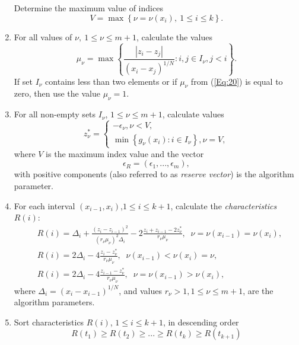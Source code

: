 \documentclass[
11pt,%
tightenlines,%
twoside,%
onecolumn,%
nofloats,%
nobibnotes,%
nofootinbib,%
superscriptaddress,%
noshowpacs,%
centertags]%
{revtex4}
\begin{document}
\begin{enumerate}
Determine the maximum value of indices
\begin{equation}\label{Eq:19}
V=\max \left\{\nu = \nu(x_i), \ 1\leq i \leq k\right\}.
\end{equation}
\item
For all values of $\nu, \ 1\leq \nu \leq m+1$, calculate the values  
\begin{equation}\label{Eq:20}
\mu_\nu = \max \left\{ \frac{\left|z_i-z_j\right|}{\left(x_i-x_j\right)^{1/N}} : i,j \in I_\nu, j<i\right\}.
\end{equation}
If set $I_\nu$ contains less than two elements or if $\mu_\nu$ from (\ref{Eq:20}) is equal to zero, then use the value $\mu_\nu=1$.
\item
For all non-empty sets $I_\nu$, $1 \leq \nu \leq m+1$, calculate values
\begin{equation}\label{Eq:21}
  z^\ast_\nu =  
   \begin{cases}
    -\epsilon_\nu,  \nu < V, \\
    \min{\left\{g_\nu(x_i):i\in I_\nu\right\}}, \nu = V,
   \end{cases}
\end{equation}
where $V$ is the maximum index value and the vector
\begin{equation}\label{Eq:22}
\epsilon _R=\left(\epsilon_1,...,\epsilon_m\right),
\end{equation}
with positive components (also referred to as \textit{reserve vector}) is the algorithm parameter.
\item
For each interval $(x_{i-1},x_i)$,$1 \leq i \leq k+1$, calculate the \textit{characteristics} $R(i)$: 
\begin{eqnarray}\label{R}
&R(i)=\Delta_i+ \frac{(z_i-z_{i-1})^2}{(r_\nu\mu_\nu)^2\Delta_i}-2\frac{z_i+z_{i-1}-2z^\ast_\nu}{r_\nu\mu_\nu},\;\; \nu=\nu(x_{i-1})=\nu(x_i),\nonumber \\
&R(i)= 2\Delta_i-4\frac{z_i-z^\ast_\nu}{r_\nu\mu_\nu},\;\; \nu(x_{i-1})<\nu(x_i)=\nu,\\
&R(i)= 2\Delta_i-4\frac{z_{i-1}-z^\ast_\nu}{r_\nu\mu_\nu},\;\; \nu = \nu(x_{i-1})>\nu(x_i),\nonumber
\end{eqnarray}
where $\Delta_i=(x_i-x_{i-1})^{1/N}$, and values $r_\nu>1, 1\leq\nu\leq m+1$, are the algorithm parameters.
\item
Sort characteristics $R(i)$, $1\leq i \leq k+1$, in descending order 	
\begin{equation}\label{Eq:23}
R(t_1)\geq R(t_2)\geq ... \geq R(t_{k})\geq R(t_{k+1})
\end{equation}

\end{enumerate}
\end{document}
